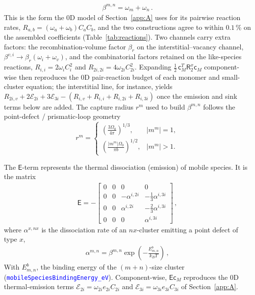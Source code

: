 \documentclass{article}
\newcommand{\textttclr}[1]{\textcolor{blue}{\texttt{#1}}}
\newcommand{\spvec}[1]{\bm{\mathsf{#1}}}   %
\newcommand{\spmat}[1]{\bm{\mathsf{#1}}}   %
\begin{document}
\begin{align}\label{eq:beta}
\beta^{m,n}=\omega_m+\omega_n\, .
\end{align}
This is the form the $0$D model of Section~\ref{app:A} uses for its pairwise reaction rates, $R_{a,b}=(\omega_a+\omega_b)C_aC_b$, and the two constructions agree to within $0.1\,\%$ on the assembled coefficients (Table~\ref{tab:reactions}). Two channels carry extra factors: the recombination-volume factor $\beta_r$ on the interstitial--vacancy channel, $\beta^{v,i}\to\beta_r(\omega_i+\omega_v)$, and the combinatorial factors retained on the like-species reactions, $R_{i,i}=2\omega_iC_i^2$ and $R_{2i,2i}=4\omega_{2i}C_{2i}^2$. Expanding $\tfrac12\,\spvec{c}_M^T\spmat{R}_2^{x}\spvec{c}_M$ component-wise then reproduces the $0$D pair-reaction budget of each monomer and small-cluster equation; the interstitial line, for instance, yields $R_{2i,v}+2\mathcal{E}_{2i}+3\mathcal{E}_{3i}-(R_{i,v}+R_{i,i}+R_{i,2i}+R_{i,3i})$ once the emission and sink terms below are added.
\noindent The capture radius $r^m$ used to build $\beta^{m,n}$ follows the point-defect / prismatic-loop geometry
\begin{equation}
    r^m =
    \begin{cases}
        \displaystyle
        \left(\frac{3\Omega_0}{4\pi}\right)^{1/3},
        & \left|m^m\right|=1,
        \\[10pt]
        \displaystyle
        \left(\frac{\left|m^m\right|\Omega_0}{\pi b}\right)^{1/2},
        & \left|m^m\right|>1.
    \end{cases}
    \label{eq:mobile_capture_radius}
\end{equation}


The $\spmat{E}$-term represents the thermal dissociation (emission) of mobile species. It is the matrix
\begin{align}\label{Eq:R1}
   {\spmat{E}} =  -
\begin{bmatrix}
 0 & 0 & 0 & 0 \\ 
0 & 0 & -\alpha^{i,2i} & -\tfrac{1}{3}\alpha^{i,3i}\\ 
0 & 0 & \alpha^{i,2i} & -\tfrac{2}{3}\alpha^{i,3i} \\ 
0 & 0 & 0 &    \alpha^{i,3i}
\end{bmatrix}\, ,
\end{align}
where $\alpha^{x,nx}$ is the dissociation rate of an $nx$-cluster emitting a point defect of type $x$,
\begin{align}
    \alpha^{m,n} = \beta^{m,n} \exp{ \left( -\frac{E^b_{m,n}}{k_B T} \right)}\, ,\label{eq:alpha}
\end{align}
With $E^b_{m,n}$, the binding energy of the $(m+n)$-size cluster (\textttclr{mobileSpeciesBindingEnergy\_eV}). Component-wise, $\spmat{E}\spvec{c}_M$ reproduces the $0$D thermal-emission terms $\mathcal{E}_{2i}=\omega_{2i}e_{2i}C_{2i}$ and $\mathcal{E}_{3i}=\omega_{3i}e_{3i}C_{3i}$ of Section~\ref{app:A}.
\end{document}
